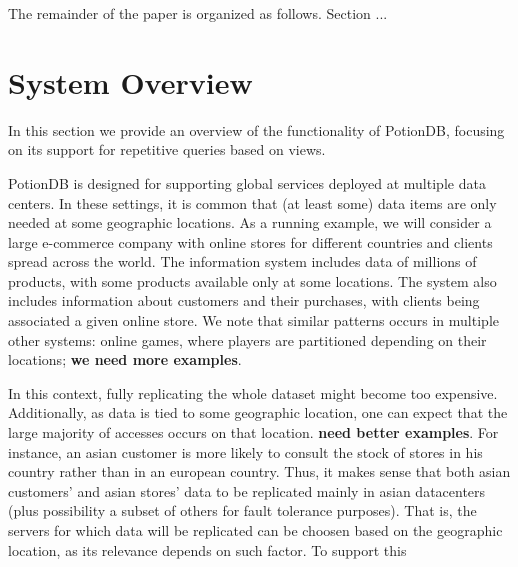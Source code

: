 \documentclass{vldb}
\newcommand{\outline}[1]{}
\begin{document}
The remainder of the paper is organized as follows. Section ...

\outline{topicos

\begin{itemize}
	\item Num. DC a aumentar
	\item Replicar totalmente tem problemas
	\item Replicação parcial
	\item Queries sobre dados replicados parcialmente
	\begin{itemize}
		\item Standard solution?
	\end{itemize}
	\item Views materializadas replicadas totalmente
	\item Contribuições
\end{itemize}
}

\section{System Overview}
\label{sec:overview}

In this section we provide an overview of the functionality of PotionDB, focusing on its support for 
repetitive queries based on views.

PotionDB is designed for supporting global services deployed at multiple data centers. In these settings,
it is common that (at least some) data items are only needed at some geographic locations. 
As a running example, we will consider a large e-commerce company with online stores for different countries 
and clients spread across the world. 
The information system includes data of millions of products, with some products available only at some locations.
The system also includes information about customers and their purchases, with clients being associated a given 
online store. 
We note that similar patterns occurs in multiple other systems: online games, where players are partitioned depending
on their locations; \textbf{we need more examples}.

In this context, fully replicating the whole dataset might become too expensive.
Additionally, as data is tied to some geographic location, one can expect that the large majority of accesses
occurs on that location.
\textbf{need better examples}.
For instance, an asian customer is more likely to consult the stock of stores in his country rather than in an european country.
Thus, it makes sense that both asian customers' and asian stores' data to be replicated mainly in asian datacenters (plus possibility a subset of others for fault tolerance purposes).
That is, the servers for which data will be replicated can be choosen based on the geographic location, as its relevance depends on such factor.
To support this 
\end{document}
